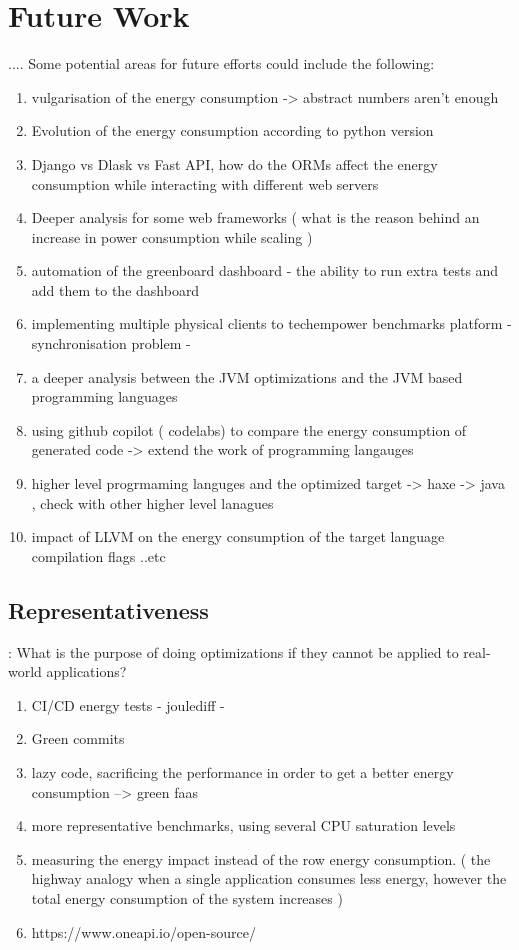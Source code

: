\section{Future Work}
.... Some potential areas for future efforts could include the following:

\begin{enumerate}
      \item  vulgarisation of the energy consumption -> abstract numbers aren't enough 
      \item  Evolution of the energy consumption according to python version 
      \item Django vs Dlask vs Fast API, how do the ORMs affect the energy consumption while interacting with different web servers
      \item Deeper analysis for some web frameworks ( what is the reason behind an increase in power consumption while scaling ) 
      \item automation of the greenboard dashboard - the ability to run extra tests and add them to the dashboard 
      \item implementing multiple physical clients to techempower benchmarks platform - synchronisation problem - 
      \item a deeper analysis between the JVM optimizations and the JVM based programming languages 
      \item using github copilot ( codelabs) to compare the energy consumption of generated code -> extend the work of programming langauges 
      \item higher level progrmaming languges and the optimized target -> haxe -> java , check with other higher level lanagues 
      \item impact of LLVM on the energy consumption of the target language  compilation flags ..etc 

\end{enumerate}


\subsection*{Representativeness} : 
What is the purpose of doing optimizations if they cannot be applied to real-world applications? 
\begin{enumerate}
      \item CI/CD energy tests  - joulediff - 
      \item Green commits 
      \item lazy code, sacrificing the performance in order to get a better energy consumption --> green faas 
      \item more representative benchmarks, using several CPU saturation levels 
      \item measuring the energy impact instead of the row energy consumption. ( the highway analogy when a single application consumes less energy, however the total energy consumption of the system increases )
      \item https://www.oneapi.io/open-source/
\end{enumerate}
\vfill \strut  %
\cleardoublepage